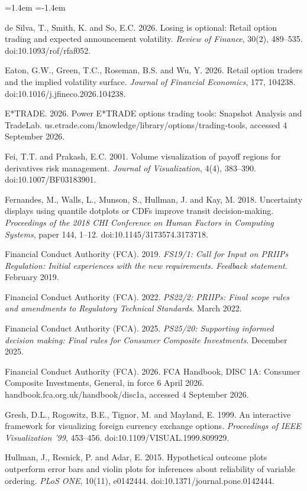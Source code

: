 \documentclass[11pt,a4paper]{article}
\begin{document}
\begin{list}{}{\leftmargin=1.4em \itemindent=-1.4em \itemsep=4pt \topsep=6pt}
\item de Silva, T., Smith, K. and So, E.C. 2026. Losing is optional: Retail option trading and expected announcement volatility. \emph{Review of Finance}, 30(2), 489--535. doi:10.1093/rof/rfaf052.
\item Eaton, G.W., Green, T.C., Roseman, B.S. and Wu, Y. 2026. Retail option traders and the implied volatility surface. \emph{Journal of Financial Economics}, 177, 104238. doi:10.1016/j.jfineco.2026.104238.
\item E*TRADE. 2026. Power E*TRADE options trading tools: Snapshot Analysis and TradeLab. us.etrade.com/knowledge/library/options/trading-tools, accessed 4 September 2026.
\item Fei, T.T. and Prakash, E.C. 2001. Volume visualization of payoff regions for derivatives risk management. \emph{Journal of Visualization}, 4(4), 383--390. doi:10.1007/BF03183901.
\item Fernandes, M., Walls, L., Munson, S., Hullman, J. and Kay, M. 2018. Uncertainty displays using quantile dotplots or CDFs improve transit decision-making. \emph{Proceedings of the 2018 CHI Conference on Human Factors in Computing Systems}, paper 144, 1--12. doi:10.1145/3173574.3173718.
\item Financial Conduct Authority (FCA). 2019. \emph{FS19/1: Call for Input on PRIIPs Regulation: Initial experiences with the new requirements. Feedback statement}. February 2019.
\item Financial Conduct Authority (FCA). 2022. \emph{PS22/2: PRIIPs: Final scope rules and amendments to Regulatory Technical Standards}. March 2022.
\item Financial Conduct Authority (FCA). 2025. \emph{PS25/20: Supporting informed decision making: Final rules for Consumer Composite Investments}. December 2025.
\item Financial Conduct Authority (FCA). 2026. FCA Handbook, DISC 1A: Consumer Composite Investments, General, in force 6 April 2026. handbook.fca.org.uk/handbook/disc1a, accessed 4 September 2026.
\item Gresh, D.L., Rogowitz, B.E., Tignor, M. and Mayland, E. 1999. An interactive framework for visualizing foreign currency exchange options. \emph{Proceedings of IEEE Visualization '99}, 453--456. doi:10.1109/VISUAL.1999.809929.
\item Hullman, J., Resnick, P. and Adar, E. 2015. Hypothetical outcome plots outperform error bars and violin plots for inferences about reliability of variable ordering. \emph{PLoS ONE}, 10(11), e0142444. doi:10.1371/journal.pone.0142444.

\end{list}
\end{document}
